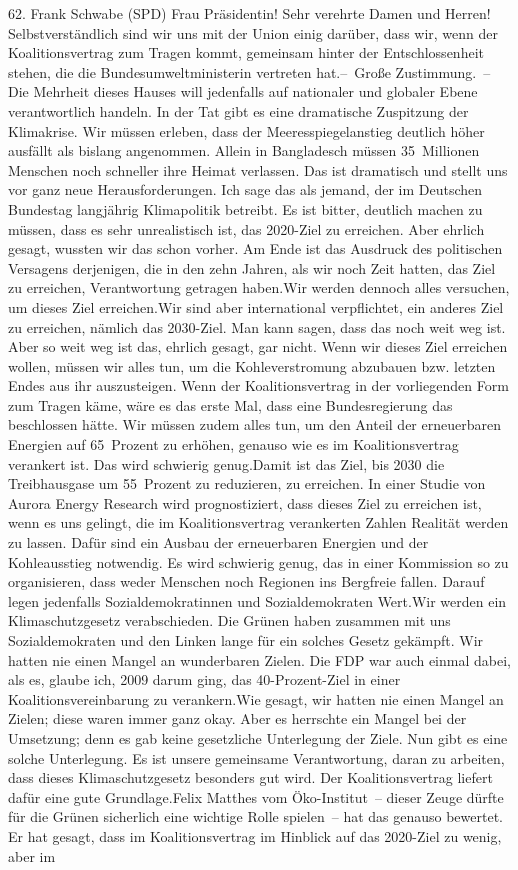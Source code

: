 \documentclass{article}
\begin{document}
	62. Frank Schwabe (SPD) Frau Präsidentin! Sehr verehrte Damen und Herren! Selbstverständlich sind wir uns mit der Union einig darüber, dass wir, wenn der Koalitionsvertrag zum Tragen kommt, gemeinsam hinter der Entschlossenheit stehen, die die Bundesumweltministerin vertreten hat.– Große Zustimmung. – Die Mehrheit dieses Hauses will jedenfalls auf nationaler und globaler Ebene verantwortlich handeln. In der Tat gibt es eine dramatische Zuspitzung der Klimakrise. Wir müssen erleben, dass der Meeresspiegelanstieg deutlich höher ausfällt als bislang angenommen. Allein in Bangladesch müssen 35 Millionen Menschen noch schneller ihre Heimat verlassen. Das ist dramatisch und stellt uns vor ganz neue Herausforderungen. Ich sage das als jemand, der im Deutschen Bundestag langjährig Klimapolitik betreibt. Es ist bitter, deutlich machen zu müssen, dass es sehr unrealistisch ist, das 2020-Ziel zu erreichen. Aber ehrlich gesagt, wussten wir das schon vorher. Am Ende ist das Ausdruck des politischen Versagens derjenigen, die in den zehn Jahren, als wir noch Zeit hatten, das Ziel zu erreichen, Verantwortung getragen haben.Wir werden dennoch alles versuchen, um dieses Ziel erreichen.Wir sind aber international verpflichtet, ein anderes Ziel zu erreichen, nämlich das 2030-Ziel. Man kann sagen, dass das noch weit weg ist. Aber so weit weg ist das, ehrlich gesagt, gar nicht. Wenn wir dieses Ziel erreichen wollen, müssen wir alles tun, um die Kohleverstromung abzubauen bzw. letzten Endes aus ihr auszusteigen. Wenn der Koalitionsvertrag in der vorliegenden Form zum Tragen käme, wäre es das erste Mal, dass eine Bundesregierung das beschlossen hätte. Wir müssen zudem alles tun, um den Anteil der erneuerbaren Energien auf 65 Prozent zu erhöhen, genauso wie es im Koalitionsvertrag verankert ist. Das wird schwierig genug.Damit ist das Ziel, bis 2030 die Treibhausgase um 55 Prozent zu reduzieren, zu erreichen. In einer Studie von Aurora Energy Research wird prognostiziert, dass dieses Ziel zu erreichen ist, wenn es uns gelingt, die im Koalitionsvertrag verankerten Zahlen Realität werden zu lassen. Dafür sind ein Ausbau der erneuerbaren Energien und der Kohleausstieg notwendig. Es wird schwierig genug, das in einer Kommission so zu organisieren, dass weder Menschen noch Regionen ins Bergfreie fallen. Darauf legen jedenfalls Sozialdemokratinnen und Sozialdemokraten Wert.Wir werden ein Klimaschutzgesetz verabschieden. Die Grünen haben zusammen mit uns Sozialdemokraten und den Linken lange für ein solches Gesetz gekämpft. Wir hatten nie einen Mangel an wunderbaren Zielen. Die FDP war auch einmal dabei, als es, glaube ich, 2009 darum ging, das 40-Prozent-Ziel in einer Koalitionsvereinbarung zu verankern.Wie gesagt, wir hatten nie einen Mangel an Zielen; diese waren immer ganz okay. Aber es herrschte ein Mangel bei der Umsetzung; denn es gab keine gesetzliche Unterlegung der Ziele. Nun gibt es eine solche Unterlegung. Es ist unsere gemeinsame Verantwortung, daran zu arbeiten, dass dieses Klimaschutzgesetz besonders gut wird. Der Koalitionsvertrag liefert dafür eine gute Grundlage.Felix Matthes vom Öko-Institut – dieser Zeuge dürfte für die Grünen sicherlich eine wichtige Rolle spielen – hat das genauso bewertet. Er hat gesagt, dass im Koalitionsvertrag im Hinblick auf das 2020-Ziel zu wenig, aber im 
\end{document}
